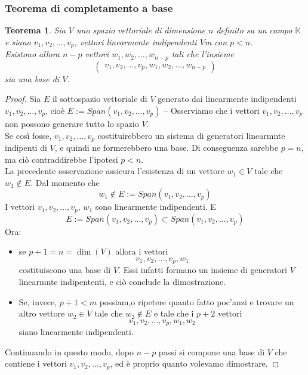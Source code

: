 \documentclass{book}
\newtheorem{teorema}{Teorema}
\begin{document}
\subsubsection{Teorema di completamento a base}
\label{sssec:teodicomabase}
\begin{teorema}
  Sia $V$ uno spazio vettoriale di dimensione $n$ definito su un campo $\mathbb{K}$ e siano $v_1,v_2,\dots,v_p$,
  vettori linearmente indipendenti $V$m con $p<n$.\\
  Esistono allora $n-p$ vettori $w_1,w_2,\dots,w_{n-p}$ tali che l'insieme
  \begin{equation*}
    \begin{pmatrix}
      v_1,v_2,\dots,v_p,w_1,w_2,\dots,w_{n-p}
    \end{pmatrix}
  \end{equation*}
  sia una base di $V$.
\end{teorema}
\begin{proof}
  Sia $E$ il sottospazio vettoriale di $V$ generato dai linearmente indipendenti $v_1,v_2,\dots,v_p$, cioè
  $E:=Span(v_1,v_2,\dots,v_p)$ -- Osserviamo che i vettori $v_1,v_2,\dots,v_p$ non possono generare tutto lo
  spazio $V$.\\
  Se così fosse, $v_1,v_2,\dots,v_p$ costituirebbero un sistema di generatori linearmnte indipenti di $V$, e
  quindi ne formerebbero una base. Di conseguenza sarebbe $p=n$, ma ciò contraddirebbe l'ipotesi $p<n$.\\
  La precedente osservazione assicura l'esistenza di un vettore $w_1\in V$ tale che $w_1\notin E$. Dal momento
  che
  \begin{equation*}
    w_1\notin E:=Span(v_1,v_2,\dots,v_p)
  \end{equation*}
  I vettori $v_1,v_2,\dots,v_p$, $w_1$ sono linearmente indipendenti. E
  \begin{equation*}
    E:=Span(v_1,v_2,\dots,v_p) \subset Span(v_1,v_2,\dots,v_p)
  \end{equation*}
  Ora:
  \begin{itemize}
  \item se $p+1=n=\dim (V)$ allora i vettori
    \begin{equation*}
      v_1,v_2,\dots,v_p,w_1
    \end{equation*}
    costituiscono una base di $V$. Essi infatti formano un insieme di generatori $V$ linearmnte indipententi, e
    ciò conclude la dimostrazione.
  \item Se, invece, $p+1<m$ possiam,o ripetere quanto fatto poc'anzi e trovare un altro vettore $w_2\in V$
    tale che $w_2\notin E$ e tale che i $p+2$ vettori
    \begin{equation*}
      v_1,v_2,\dots,v_p,w_1,w_2
    \end{equation*}
    siano linearmente indipendenti.
  \end{itemize}
  Continuando in questo modo, dopo $n-p$ passi si compone una base di $V$ che contiene i vettori
  $v_1,v_2,\dots,v_p$, ed è proprio quanto volevamo dimostrare.
\end{proof}
\end{document}
